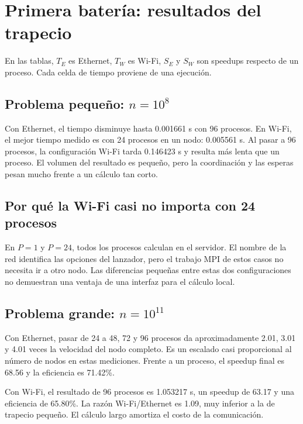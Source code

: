 \section{Primera batería: resultados del trapecio}

En las tablas, $T_E$ es Ethernet, $T_W$ es Wi-Fi, $S_E$ y $S_W$ son speedups respecto de un proceso. Cada celda de tiempo proviene de una ejecución.

\subsection{Problema pequeño: \texorpdfstring{$n=10^8$}{n = 100000000}}

Con Ethernet, el tiempo disminuye hasta 0.001661 s con 96 procesos. En Wi-Fi, el mejor tiempo medido es con 24 procesos en un nodo: 0.005561 s. Al pasar a 96 procesos, la configuración Wi-Fi tarda 0.146423 s y resulta más lenta que un proceso. El volumen del resultado es pequeño, pero la coordinación y las esperas pesan mucho frente a un cálculo tan corto.


\subsection{Por qué la Wi-Fi casi no importa con 24 procesos}
En $P=1$ y $P=24$, todos los procesos calculan en el servidor. El nombre de la red identifica las opciones del lanzador, pero el trabajo MPI de estos casos no necesita ir a otro nodo. Las diferencias pequeñas entre estas dos configuraciones no demuestran una ventaja de una interfaz para el cálculo local.

\subsection{Problema grande: \texorpdfstring{$n=10^{11}$}{n = 100000000000}}\label{sec:trap-grande}


Con Ethernet, pasar de 24 a 48, 72 y 96 procesos da aproximadamente 2.01, 3.01 y 4.01 veces la velocidad del nodo completo. Es un escalado casi proporcional al número de nodos en estas mediciones. Frente a un proceso, el speedup final es 68.56 y la eficiencia es 71.42\%.

Con Wi-Fi, el resultado de 96 procesos es 1.053217 s, un speedup de 63.17 y una eficiencia de 65.80\%. La razón Wi-Fi/Ethernet es 1.09, muy inferior a la de trapecio pequeño. El cálculo largo amortiza el costo de la comunicación.

